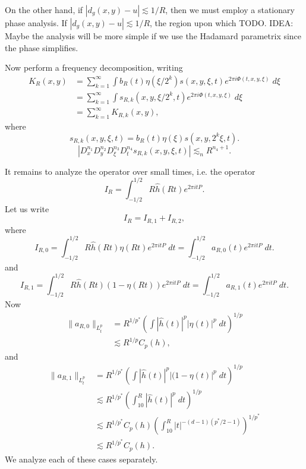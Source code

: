 On the other hand, if $|d_g(x,y) - u| \lesssim 1/R$, then we must employ a stationary phase analysis. If $|d_g(x,y) - u| \lesssim 1/R$, the region upon which TODO. IDEA: Maybe the analysis will be more simple if we use the Hadamard parametrix since the phase simplifies.





Now perform a frequency decomposition, writing
%
\begin{align*}
    K_R(x,y) &= \sum_{k=1}^\infty \int b_R(t) \eta(\xi / 2^k) s(x,y,\xi,t) e^{2 \pi i \Phi(t,x,y,\xi)}\; d\xi\\
    &= \sum_{k = 1}^\infty \int s_{R,k}(x,y,\xi / 2^k,t) e^{2 \pi i \Phi(t,x,y,\xi)}\; d\xi\\
    &= \sum_{k = 1}^\infty K_{R,k}(x,y),
\end{align*}    
%
where
%
\[ s_{R,k}(x,y,\xi,t) = b_R(t) \eta(\xi) s(x,y,2^k \xi, t). \]
%
%
\[ |D^{n_1}_x D^{n_2}_y D^{n_3}_\xi D^{n_4}_t s_{R,k}(x,y,\xi,t)| \lesssim_n R^{n_4+1}. \]


\newpage



It remains to analyze the operator over small times, i.e. the operator
%
\[ I_R = \int_{-1/2}^{1/2} R \widehat{h}(Rt) e^{2 \pi i t P}. \]
%
Let us write
%
\[ I_R = I_{R,1} + I_{R,2}, \]
%
where
%
\[ I_{R,0} = \int_{-1/2}^{1/2} R \widehat{h}(Rt) \eta(Rt) e^{2 \pi i t P}\; dt = \int_{-1/2}^{1/2} a_{R,0}(t) e^{2 \pi i t P}\; dt. \]
%
and
%
\[ I_{R,1} = \int_{-1/2}^{1/2} R \widehat{h}(Rt) (1 - \eta(Rt)) e^{2 \pi i t P}\; dt = \int_{-1/2}^{1/2} a_{R,1}(t) e^{2 \pi i t P}\; dt. \]
%
Now
%
\begin{align*}
    \| a_{R,0} \|_{L^p_t} &= R^{1/p^*} \left( \int |\widehat{h}(t)|^p |\eta(t)|^p\; dt \right)^{1/p}\\
    &\lesssim R^{1/p} C_p(h),
\end{align*}
%
and
%
\begin{align*}
    \| a_{R,1} \|_{L^p_t} &= R^{1/p^*} \left( \int |\widehat{h}(t)|^p |(1 - \eta(t)|^p\; dt \right)^{1/p}\\
    &\lesssim R^{1/p^*} \left( \int_{10}^R |\widehat{h}(t)|^p\; dt \right)^{1/p}\\
    &\lesssim R^{1/p^*} C_p(h) \left( \int_{10}^R |t|^{-(d-1)(p^*/2 - 1)} \right)^{1/p^*}\\
    &\lesssim R^{1/p^*} C_p(h).
\end{align*}
%
We analyze each of these cases separately.

